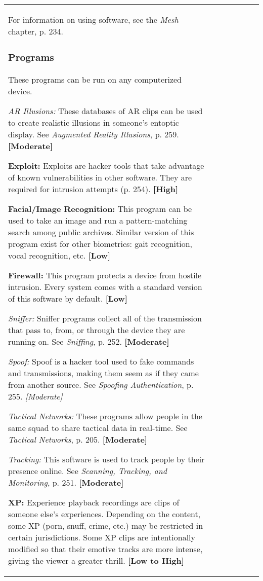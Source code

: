 \begin{tabular}{|l|l|l|l|l|l|l|}
For information on using software, see the \emph{Mesh} chapter, p. 234. 

\subsubsection{Programs} 

These programs can be run on any computerized device. 

\emph{AR Illusions: }These databases of AR clips can be used to create realistic illusions in someone’s entoptic display. See \emph{Augmented Reality Illusions}, p. 259. \textbf{[Moderate]} 

\textbf{Exploit:} Exploits are hacker tools that take advantage of known vulnerabilities in other software. They are required for intrusion attempts (p. 254). \textbf{[High]} 

\textbf{Facial/Image Recognition:} This program can be used to take an image and run a pattern-matching search among public archives. Similar version of this program exist for other biometrics: gait recognition, vocal recognition, etc. \textbf{[Low]} 

\textbf{Firewall:} This program protects a device from hostile intrusion. Every system comes with a standard version of this software by default. \textbf{[Low]} 

\emph{Sniffer:} Sniffer programs collect all of the transmission that pass to, from, or through the device they are running on. See \emph{Sniffing}, p. 252. \textbf{[Moderate]} 

\emph{Spoof:} Spoof is a hacker tool used to fake commands and transmissions, making them seem as if they came from another source. See \emph{Spoofing Authentication}, p. 255. \emph{[Moderate]} 

\emph{Tactical Networks:} These programs allow people in the same squad to share tactical data in real-time. See \emph{Tactical Networks}, p. 205. \textbf{[Moderate]} 

\emph{Tracking:} This software is used to track people by their presence online. See \emph{Scanning, Tracking, and Monitoring}, p. 251. \textbf{[Moderate]} 

\textbf{XP:} Experience playback recordings are clips of someone else’s experiences. Depending on the content, some XP (porn, snuff, crime, etc.) may be restricted in certain jurisdictions. Some XP clips are intentionally modified so that their emotive tracks are more intense, giving the viewer a greater thrill. \textbf{[Low to High]} 


\end{tabular}
